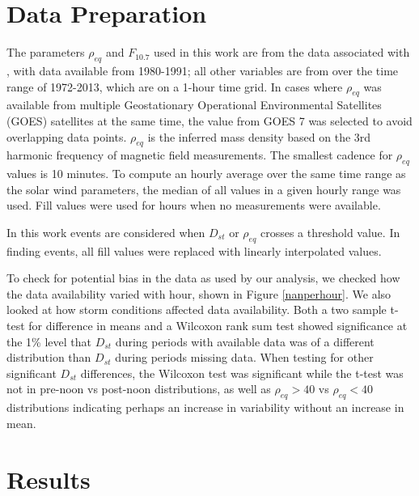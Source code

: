 \documentclass[10pt,twocolumn]{article}
\begin{document}
\section{Data Preparation}

The parameters $\rho_{eq}$ and $F_{10.7}$ used in this work are from the data associated with \cite{Denton}, with data available from 1980-1991; all other variables are from \cite{Reconstruction} over the time range of 1972-2013, which are on a 1-hour time grid.  In cases where $\rho_{eq}$ was available from multiple Geostationary Operational Environmental Satellites (GOES) satellites at the same time, the value from GOES 7 was selected to avoid overlapping data points.  $\rho_{eq}$ is the inferred mass density based on the 3rd harmonic frequency of magnetic field measurements.  The smallest cadence for $\rho_{eq}$ values is 10 minutes.  To compute an hourly average over the same time range as the solar wind parameters, the median of all values in a given hourly range was used.  Fill values were used for hours when no measurements were available.

In this work events are considered when $D_{st}$ or $\rho_{eq}$ crosses a threshold value.  In finding events, all fill values were replaced with linearly interpolated values.  


To check for potential bias in the data as used by our analysis, we checked how the data availability varied with hour, shown in Figure \ref{nanperhour}. We also looked at how storm conditions affected data availability. Both a two sample t-test for difference in means and a Wilcoxon rank sum test showed significance at the 1\% level that $D_{st}$ during periods with available data was of a different distribution than $D_{st}$ during periods missing data. When testing for other significant $D_{st}$ differences, the Wilcoxon test was significant while the t-test was not in pre-noon vs post-noon distributions, as well as $\rho_{eq}>40$ vs $\rho_{eq}<40$ distributions indicating perhaps an increase in variability without an increase in mean.

\section{Results}
\end{document}
